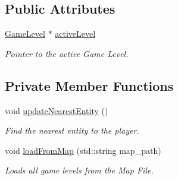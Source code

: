 \subsection*{Public Attributes}
\begin{DoxyCompactItemize}
\item 
\mbox{\label{class_game_manager_a52a95204d16282494d51c01df8fa5d41}} 
\mbox{\hyperlink{class_game_level}{Game\+Level}} $\ast$ \mbox{\hyperlink{class_game_manager_a52a95204d16282494d51c01df8fa5d41}{active\+Level}}
\begin{DoxyCompactList}\small\item\em Pointer to the active Game Level. \end{DoxyCompactList}\end{DoxyCompactItemize}
\subsection*{Private Member Functions}
\begin{DoxyCompactItemize}
\item 
\mbox{\label{class_game_manager_a8825259548e214aceeaee08ee1625cb6}} 
void \mbox{\hyperlink{class_game_manager_a8825259548e214aceeaee08ee1625cb6}{update\+Nearest\+Entity}} ()
\begin{DoxyCompactList}\small\item\em Find the nearest entity to the player. \end{DoxyCompactList}\item 
void \mbox{\hyperlink{class_game_manager_aac4e797ebddf3ae590fa5b306ea9be40}{load\+From\+Map}} (std\+::string map\+\_\+path)
\begin{DoxyCompactList}\small\item\em Loads all game levels from the Map File. \end{DoxyCompactList}\end{DoxyCompactItemize}
